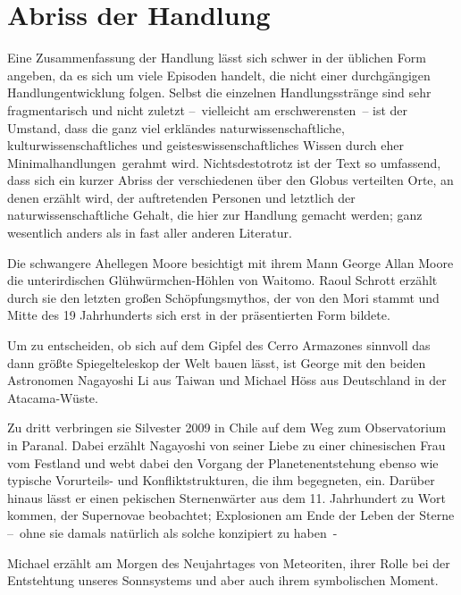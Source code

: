 \chapter*{Abriss der Handlung}\label{ch:summary}

Eine Zusammenfassung der Handlung lässt sich schwer in der üblichen Form
  angeben, da es sich um viele Episoden handelt, die nicht einer durchgängigen
  Handlungentwicklung folgen.
Selbst die einzelnen Handlungsstränge sind sehr fragmentarisch und nicht
  zuletzt --~\dhei vielleicht am erschwerensten~-- ist der Umstand, dass die
  ganz viel erkländes naturwissenschaftliche, 
  kulturwissenschaftliches und geisteswissenschaftliches Wissen durch eher
  \glqq Minimalhandlungen\grqq\ gerahmt wird.
Nichtsdestotrotz ist der Text so umfassend, dass sich ein kurzer Abriss der
  verschiedenen über den Globus verteilten Orte, an denen erzählt wird, der
  auftretenden Personen und letztlich der naturwissenschaftliche Gehalt, die
  hier zur Handlung gemacht werden; ganz wesentlich anders als in fast aller
  anderen Literatur. 

Die schwangere Ahellegen Moore besichtigt mit ihrem Mann George Allan Moore
  die unterirdischen Glühwürmchen-Höhlen von Waitomo. Raoul Schrott erzählt
  durch sie den letzten großen Schöpfungsmythos, der von den Mori stammt und
  Mitte des 19 Jahrhunderts sich erst in der präsentierten Form bildete.

Um zu entscheiden, ob sich auf dem Gipfel des Cerro Armazones sinnvoll das
  dann größte Spiegelteleskop der Welt bauen lässt, ist George mit den beiden
  Astronomen Nagayoshi Li aus Taiwan und Michael Höss aus Deutschland
  in der Atacama-Wüste.

Zu dritt verbringen sie Silvester 2009 in Chile auf dem Weg zum Observatorium in
  Paranal.
Dabei erzählt Nagayoshi von seiner Liebe zu einer chinesischen Frau vom
  Festland und webt dabei den Vorgang der Planetenentstehung ebenso wie
  typische Vorurteils- und Konfliktstrukturen, die ihm begegneten, ein.
Darüber hinaus lässt er einen pekischen Sternenwärter aus dem 11.
  Jahrhundert zu Wort kommen, der Supernovae beobachtet; Explosionen am Ende der
  Leben der Sterne --~ohne sie damals natürlich als solche konzipiert zu haben~-

Michael erzählt am Morgen des Neujahrtages von Meteoriten, ihrer Rolle bei der
  Entstehtung unseres Sonnsystems und aber auch ihrem symbolischen Moment.

